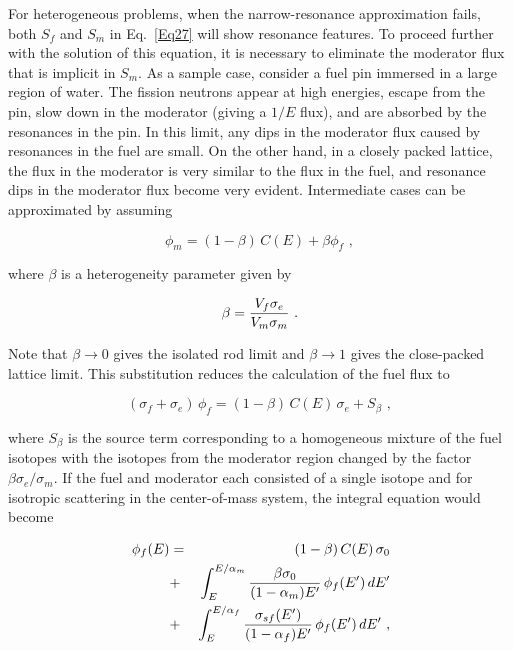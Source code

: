 For heterogeneous problems, when the narrow-resonance approximation
fails, both $S_f$ and $S_m$ in Eq.~\ref{Eq27} will show resonance features.
To proceed further with the solution of this equation, it is necessary
to eliminate the moderator flux that is implicit in $S_m$.  As
a sample case, consider a fuel pin immersed in a large region of
water.  The fission neutrons appear at high energies, escape from the
pin, slow down in the moderator (giving a $1/E$ flux), and are absorbed
by the resonances in the pin.  In this limit, any dips in the moderator
flux caused by resonances in the fuel are small.  On the other hand, in
a closely packed lattice, the flux in the moderator is very similar to
the flux in the fuel, and resonance dips in the moderator flux become
very evident.  Intermediate cases can be approximated\cite{ref9} by assuming

  \begin{equation}
    \phi_m=(1-\beta)\,{C(E)}+\beta\phi_f\,\,,
  \end{equation}

\noindent
where $\beta$ is a heterogeneity parameter given by

  \begin{equation}
    \beta={{V_f\sigma_e}\over{V_m\sigma_m}}\,\,.
  \end{equation}

\noindent
Note that $\beta\rightarrow 0$ gives the isolated rod limit and
$\beta\rightarrow 1$ gives the close-packed lattice limit.  This
substitution reduces the calculation of the fuel flux to

  \begin{equation}
    (\sigma_f+\sigma_e)\,\phi_f=(1-\beta)\,
    {C(E)\,\sigma_e }+S_\beta\,\,,
  \end{equation}

\noindent
where $S_\beta$ is the source term corresponding to a homogeneous mixture
of the fuel isotopes with the isotopes from the moderator region changed
by the factor $\beta\sigma_e/\sigma_m$.  If the fuel and moderator each
consisted of a single isotope and for isotropic scattering in the
center-of-mass system, the integral equation would become

  \begin{eqnarray}
    [\sigma_0+\sigma_t(E)]\,\phi_f(E)&=&
    (1-\beta)\,{C(E)\,\sigma_0}\nonumber\\
    &+&\int_E^{E/\alpha_m}{{\beta\sigma_0}\over
    {(1-\alpha_m)E'}}\,\phi_f(E')\,dE'\nonumber\\
    &+&\int_E^{E/\alpha_f}{{\sigma_{sf}(E')} \over
    {(1-\alpha_f)E'}}\,\phi_f(E')\,dE'\,\,,
  \label{Eq37}
  \end{eqnarray}

